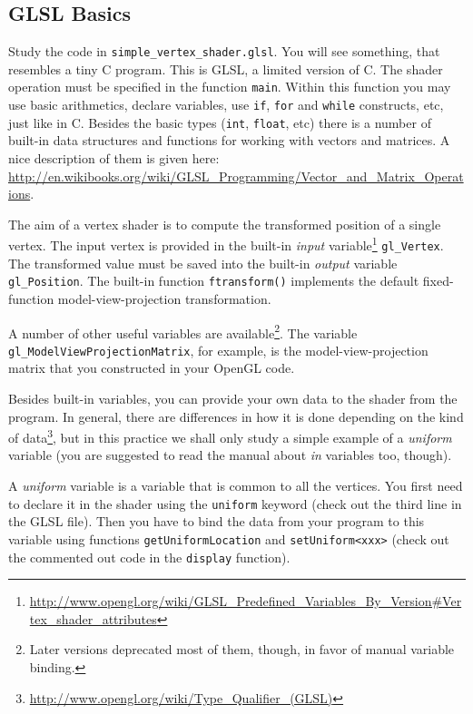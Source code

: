 \documentclass{article}
\begin{document}
\subsection*{GLSL Basics}
Study the code in \verb#simple_vertex_shader.glsl#. You will see something, that resembles a tiny C program. This is GLSL, a limited version of C. The shader operation must be specified in the function \verb#main#. Within this function you may use basic arithmetics, declare variables, use \texttt{if}, \texttt{for} and \texttt{while} constructs, etc, just like in C. Besides the basic types (\texttt{int}, \texttt{float}, etc) there is a number of built-in data structures and functions for working with vectors and matrices. A nice description of them is given here: \url{http://en.wikibooks.org/wiki/GLSL_Programming/Vector_and_Matrix_Operations}.

The aim of a vertex shader is to compute the transformed position of a single vertex. The input vertex is provided in the built-in \emph{input} variable\footnote{\url{http://www.opengl.org/wiki/GLSL_Predefined_Variables_By_Version\#Vertex_shader_attributes}} \verb#gl_Vertex#. The transformed value must be saved into the built-in \emph{output} variable \verb#gl_Position#. The built-in function \verb#ftransform()# implements the default fixed-function model-view-projection transformation.

A number of other useful variables are available\footnote{Later versions deprecated most of them, though, in favor of manual variable binding.}. The variable\\ \verb#gl_ModelViewProjectionMatrix#, for example, is the model-view-projection matrix that you constructed in your OpenGL code.

Besides built-in variables, you can provide your own data to the shader from the program. In general, there are differences in how it is done depending on the kind of data\footnote{\url{http://www.opengl.org/wiki/Type_Qualifier_(GLSL)}}, but in this practice we shall only study a simple example of a \emph{uniform} variable (you are suggested to read the manual about \emph{in} variables too, though).

A \emph{uniform} variable is a variable that is common to all the vertices. You first need to declare it in the shader using the \texttt{uniform} keyword (check out the third line in the GLSL file). Then you have to bind the data from your program to this variable using functions \texttt{getUniformLocation} and \texttt{setUniform<xxx>} (check out the commented out code in the \texttt{display} function).
\end{document}
